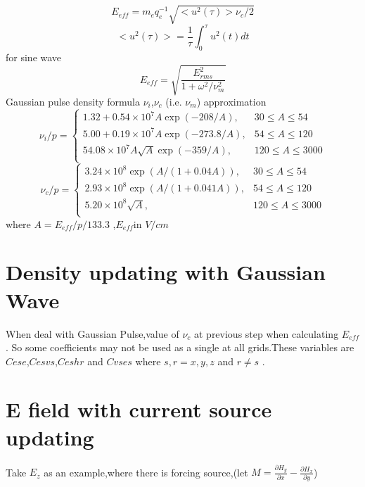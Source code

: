 \documentclass[a4paper,10pt]{article}
\begin{document}
\begin{equation}\label{EeffNorm}
E_{eff} = m_{e} q_{e}^{-1} \sqrt{ < u^{2}(\tau) > \nu_{c} /2 }
\end{equation}
\begin{equation}
<u^{2}(\tau)>=\frac{1}{\tau}\int^{\tau}_{0}u^{2}(t)d t
\end{equation}
for sine wave
\begin{equation}
E_{eff}=\sqrt{\frac{E_{rms}^{2}}{1+\omega^{2}/\nu^{2}_{m}}}
\end{equation}
Gaussian pulse density formula
$\nu_{i}$,$\nu_{c}$ (i.e. $\nu_{m}$) approximation
\begin{equation}\label{nu_i_1}
\nu_{i}/p=\left\lbrace\begin{array}{ll}
1.32+0.54\times 10^7A \exp \left(-208/A\right),&30\leqslant A\leqslant 54\\
5.00+0.19\times 10^7A \exp \left(-273.8/A\right),&54\leqslant A\leqslant 120\\
54.08\times 10^7A \sqrt{A} \exp \left(-359/A\right),&120\leqslant A\leqslant 3000\\
\end{array}\right.
\end{equation}
\begin{equation}\label{nu_c_1}
\nu_{c}/p=\left\lbrace\begin{array}{ll}
3.24\times 10^8 \exp\left( A/(1+0.04A)\right),&30\leqslant A\leqslant 54\\
2.93\times 10^8 \exp\left( A/(1+0.041A)\right),&54\leqslant A\leqslant 120\\
5.20\times 10^8 \sqrt{A},&120\leqslant A\leqslant 3000\\
\end{array}\right.
\end{equation}
where $A=E_{eff}/p/133.3$ ,$E_{eff}$in $V/cm$
\section{Density updating with Gaussian Wave}
When deal with Gaussian Pulse,value of  $\nu_{c}$ at  previous step when calculating $E_{eff}$.
So some coefficients may not be used as a single at all grids.These variables are $Cese$,$Cesvs$,$Ceshr$ and $Cvses$ 
where  $ s,r=x,y,z $ and $ r \neq s $ .


\section{E field with current source updating}
Take $E_{z}$ as an example,where there is forcing source,(let $M=\frac{\partial H_{y}}{\partial x}-\frac{\partial H_{x}}{\partial y}$)
\end{document}
